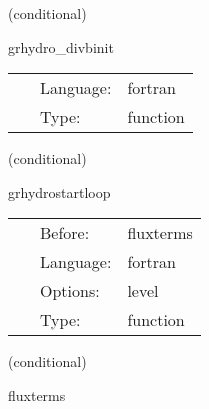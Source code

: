 \documentclass{article}
\begin{document}
\vspace{5mm}

   (conditional) 

\hspace{5mm} grhydro\_divbinit 

\hspace{5mm}{\it set divb initially to zero } 


\hspace{5mm}

 \begin{tabular*}{160mm}{cll} 
~ & Language:  & fortran \\ 
~ & Type:  & function \\ 
\end{tabular*} 


\vspace{5mm}

   (conditional) 

\hspace{5mm} grhydrostartloop 

\hspace{5mm}{\it set the flux\_direction variable } 


\hspace{5mm}

 \begin{tabular*}{160mm}{cll} 
~ & Before:  & fluxterms \\ 
~ & Language:  & fortran \\ 
~ & Options:  & level \\ 
~ & Type:  & function \\ 
\end{tabular*} 


\vspace{5mm}

   (conditional) 

\hspace{5mm} fluxterms 

\hspace{5mm}{\it calculation of intercell fluxes } 


\hspace{5mm}
\end{document}
